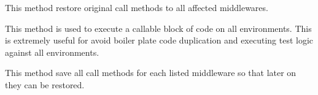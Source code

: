 \documentclass[letterpaper,10pt,english]{sphinxmanual}
\begin{document}
\begin{fulllineitems}

\begin{fulllineitems}
\label{get_started/contribute:fantastico.tests.base_case.FantasticoIntegrationTestCase._restore_call_methods}
This method restore original call methods to all affected middlewares.

\end{fulllineitems}


\begin{fulllineitems}
\label{get_started/contribute:fantastico.tests.base_case.FantasticoIntegrationTestCase._run_test_all_envs}
This method is used to execute a callable block of code on all environments. This is extremely useful for
avoid boiler plate code duplication and executing test logic against all environments.

\end{fulllineitems}


\begin{fulllineitems}
\label{get_started/contribute:fantastico.tests.base_case.FantasticoIntegrationTestCase._save_call_methods}
This method save all call methods for each listed middleware so that later on they can be restored.

\end{fulllineitems}


\end{fulllineitems}

\end{document}
